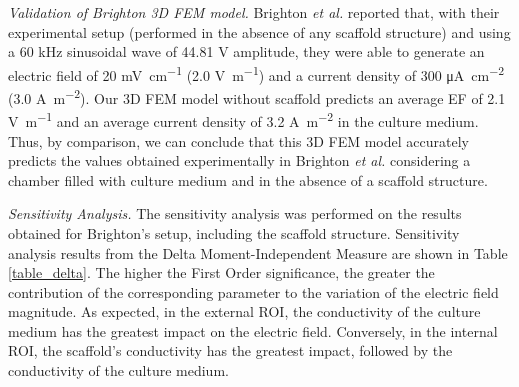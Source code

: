 \noindent \textit{Validation of Brighton \acs{3D} \acs{FEM} model.} Brighton \textit{et al.} \cite{Armstrong1988-ob, Brighton1992-gg} reported that, with their experimental setup (performed in the absence of any scaffold structure) and using a 60 \si{\kilo\hertz} sinusoidal wave of  44.81 \si{\volt} amplitude, they were able to generate an electric field of 20 \si{\milli\volt\per\centi\meter} (2.0 \si{\volt\per\meter}) and a current density of 300 \si{\micro\ampere\per\square\centi\meter} (3.0 \si{\ampere\per\square\meter}). Our \acs{3D} \acs{FEM} model without scaffold predicts an average \acs{EF} of 2.1 \si{\volt\per\meter} and an average current density of 3.2 \si{\ampere\per\square\meter}  in the culture medium. Thus, by comparison, we can conclude that this \acs{3D} \acs{FEM} model accurately predicts the values obtained experimentally in Brighton \textit{et al.} \cite{Armstrong1988-ob, Brighton1992-gg} considering a chamber filled with culture medium and in the absence of a scaffold structure. \hfill \break

\noindent \textit{Sensitivity Analysis.} The sensitivity analysis was performed on the results obtained for Brighton's setup, including the scaffold structure. Sensitivity analysis results from the Delta Moment-Independent Measure are shown in Table \ref{table_delta}. The higher the First Order significance, the greater the contribution of the corresponding parameter to the variation of the electric field magnitude. As expected, in the external \acs{ROI}, the conductivity of the culture medium has the greatest impact on the electric field. Conversely, in the internal \acs{ROI}, the scaffold's conductivity has the greatest impact, followed by the conductivity of the culture medium.


